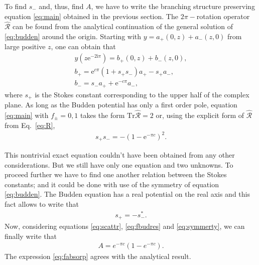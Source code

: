 \documentclass[aip,jmp,reprint]{revtex4-1}
\def\rmi{\mathrm{i}}
\def\rme{\mathrm{e}}
\def\R{\widehat{\mathcal{R}}}
\def\Tr{\mathrm{Tr}}
\begin{document}
To find $s_-$ and, thus, find $A$, we have to write the branching structure preserving 
equation \eqref{eq:main} obtained in the previous section. The $2\pi-$rotation operator $\R$
can be found from the analytical continuation of the general solution of \eqref{eq:budden}
around the origin. Starting with $y=a_+(0,z) + a_-(z,0)$ from large positive $z$, 
one can obtain that
\begin{eqnarray}
y(z \rme^{-2 \rmi \pi}) = b_+(0,z) + b_-(z,0),\\
b_+ = \rme^{c \pi} (1 + s_+s_-)a_+ - s_+a_-,\\
b_- = s_- a_+ + \rme^{-c \pi} a_-,
\label{eq:R}
\end{eqnarray}
where $s_+$ is the Stokes constant corresponding to the upper half of the complex plane.
As long as the Budden potential has only a first order pole, equation \eqref{eq:main}
with $f_\pm=0,1$ takes the form $\Tr\R=2$ or, using the explicit form of $\R$ from Eq.~\eqref{eq:R},
\begin{eqnarray}
s_+s_- = - (1-\rme^{- \pi c})^2.
\label{eq:fbudres}
\end{eqnarray}

This nontrivial exact equation couldn't have been obtained from any other considerations. But we
still have only one equation and two unknowns. To proceed further we have to find one another
relation between the Stokes constants; and it could be done with use of the symmetry 
of equation \eqref{eq:budden}. The Budden equation has a real potential on the real axis and
this fact allows to write\cite{symmetries} that
\begin{eqnarray}
s_+ = -s_-^*.
\label{eq:symmerty}
\end{eqnarray}
Now, considering equations \eqref{eq:scattr}, \eqref{eq:fbudres} and \eqref{eq:symmerty}, we can
finally write that
\begin{eqnarray}
A = e^{-\pi c}(1-e^{-\pi c}).
\label{eq:fabsorp}
\end{eqnarray}
The expression \eqref{eq:fabsorp} agrees with the analytical result\cite{rwbook}.
\end{document}

